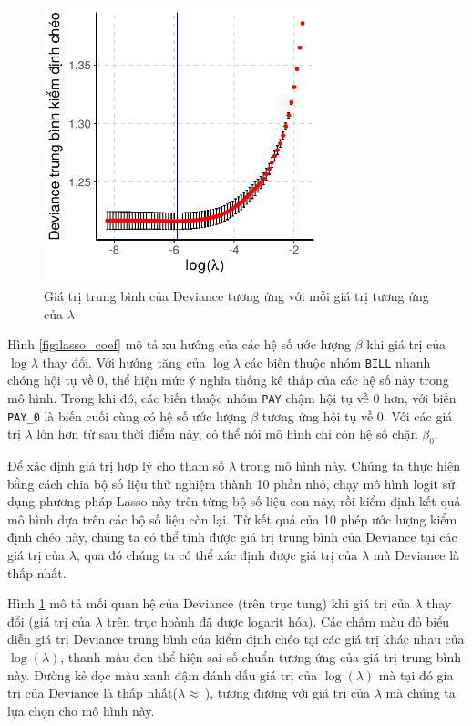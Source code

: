\documentclass[a4paper]{report}\usepackage[]{graphicx}\usepackage[]{color}
\newenvironment{knitrout}{}{} %
\begin{document}
\begin{figure}[htb!]
\centering
\capstart
\begin{knitrout}\small
{}\color{fgcolor}
\includegraphics[width=8cm,height=8cm]{Figures/lasso_cv-1} 

\end{knitrout}
\caption{Giá trị trung bình của Deviance tương ứng với mỗi giá trị tương ứng của $\lambda$}
\label{fig:lasso_cv}
\end{figure}

Hình \ref{fig:lasso_coef} mô tả xu hướng của các hệ số ước lượng $\beta$ khi giá trị của $\log\lambda$ thay đổi.
Với hướng tăng của $\log\lambda$ các biến thuộc nhóm \texttt{BILL} nhanh chóng hội tụ về $0$, thể hiện mức ý nghĩa thống kê thấp của các hệ số này trong mô hình. Trong khi đó, các biến thuộc nhóm \texttt{PAY} chậm hội tụ về $0$ hơn, với biến \texttt{PAY\_0} là biến cuối cùng có hệ số ước lượng $\beta$ tương ứng hội tụ về 0.
Với các giá trị $\lambda$ lớn hơn từ sau thời điểm này, có thể nói mô hình chỉ còn hệ số chặn $\beta_0$.

Để xác định giá trị hợp lý cho tham số $\lambda$ trong mô hình này. Chúng ta thực hiện bằng cách chia bộ số liệu thử nghiệm thành 10 phần nhỏ, chạy mô hình logit sử dụng phương pháp Lasso này trên từng bộ số liệu con này, rồi kiểm định kết quả mô hình dựa trên các bộ số liệu còn lại.
Từ kết quả của 10 phép ước lượng kiểm định chéo này, chúng ta có thể tính được giá trị trung bình của Deviance tại các giá trị của $\lambda$, qua đó chúng ta có thể xác định được giá trị của $\lambda$ mà Deviance là thấp nhất.

Hình \ref{fig:lasso_cv} mô tả mối quan hệ của Deviance (trên trục tung) khi giá trị của $\lambda$ thay đổi (giá trị của $\lambda$ trên trục hoành đã được logarit hóa). Các chấm màu đỏ biểu diễn giá trị Deviance trung bình của kiểm định chéo tại các giá trị khác nhau của $\log(\lambda)$, thanh màu đen thể hiện sai số chuẩn tương ứng của giá trị trung bình này. Đường kẻ dọc màu xanh đậm đánh dấu giá trị của $\log(\lambda)$ mà tại đó gía trị của Deviance là thấp nhất($\lambda \approx\ $), tương đương với giá trị của $\lambda$ mà chúng ta lựa chọn cho mô hình này.
\end{document}
